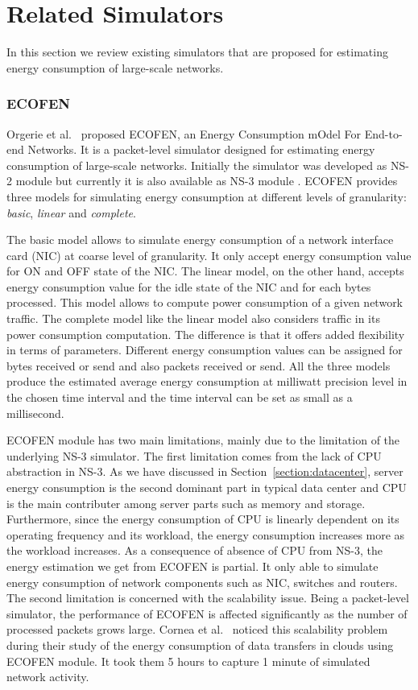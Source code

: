 \section{Related Simulators}
\label{section:relatedsimulator} 
In this section we review existing simulators that are proposed for estimating energy consumption of large-scale networks. 
\subsubsection{ECOFEN}
\label{subsection:ecofen} 
Orgerie et al.{\ }\cite{DBLP:conf/wowmom/OrgerieLLL11} proposed ECOFEN, an Energy Consumption
mOdel For End-to-end Networks. It is a packet-level simulator designed for estimating energy consumption of large-scale networks. Initially the simulator was developed as NS-2 module but currently it is also available as NS-3 module \cite{DBLP:conf/cloudnet/CorneaOL14}. ECOFEN provides three models for simulating energy consumption at different levels of granularity: \emph{basic}, \emph{linear} and \emph{complete}.

The basic model allows to simulate energy consumption of a network interface card (NIC) at coarse level of granularity. It only accept energy consumption value for ON and OFF state of the NIC. The linear model, on the other hand, accepts energy consumption value for the idle state of the NIC and for each bytes processed. This model allows to compute power consumption of a given network traffic. The complete model like the linear model also considers traffic in its power consumption computation. The difference is that it offers added flexibility in terms of parameters. Different energy consumption values can be assigned for bytes received or send and also packets received or send. All the three models produce the estimated average energy consumption at milliwatt precision level in the chosen time interval and the time interval can be set as small as a millisecond. 

ECOFEN module has two main limitations, mainly due to the limitation of the underlying NS-3 simulator. The first limitation comes from the lack of CPU abstraction in NS-3. As we have discussed in Section~\ref{section:datacenter}, server energy consumption is the second dominant part in typical data center and CPU is the main contributer among server parts such as memory and storage. Furthermore, since the energy consumption of CPU is linearly dependent on its operating frequency and its workload, the energy consumption increases more as the workload increases. As a consequence of absence of CPU from NS-3, the energy estimation we get from ECOFEN is partial. It only able to simulate energy consumption of network components such as NIC, switches and routers. The second limitation is concerned with the scalability issue. Being a packet-level simulator, the performance of ECOFEN is affected significantly as the number of processed packets grows large. Cornea et al.{\ }\cite{DBLP:conf/cloudnet/CorneaOL14} noticed this scalability problem during their study of the energy consumption of data transfers in clouds using ECOFEN module. It took them 5 hours to capture 1 minute of simulated network activity. 
